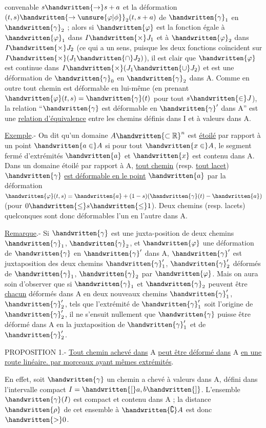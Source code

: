 
convenable $s\handwritten{\to}s+a$ et la déformation $(t,s)\handwritten{\to\unsure{\varphi|\phi}}_2(t,s+a)$ de $\handwritten{\gamma}_1$ en $\handwritten{\gamma}_2$ ; alors si $\handwritten{\varphi}$ est la fonction égale à $\handwritten{\varphi}_1$ dans \handwritten{\unsure{\textasciigrave|\textbackslash}}$I\handwritten{\times}J_1$ et à $\handwritten{\varphi}_2$ dans $I\handwritten{\times}J_2$ (ce qui a un sens, puisque les deux fonctions coïncident sur $I\handwritten{\times}(J_1\handwritten{\cap}J_2)$), il est clair que $\handwritten{\varphi}$ est continue dans $I\handwritten{\times}(J_1\handwritten{\cup}J_2)$ et est une déformation de $\handwritten{\gamma}_0$ en $\handwritten{\gamma}_2$ dans A. Comme en outre tout chemin est déformable en lui-même (en prenant $\handwritten{\varphi}(t,s)=\handwritten{\gamma}(t)$ pour tout $s\handwritten{\in}J$), la relation ``$\handwritten{\gamma}$ est déformable en $\handwritten{\gamma}'$ dans A'' est une \uline{relation d'équivalence} entre les chemins définis dans I et à valeurs dans A.

\uline{Exemple}.- On dit qu'un domaine $A\handwritten{\subset\mathbb{R}}^n$ est \uline{étoilé} par rapport à un point $\handwritten{a\in}A$ si pour tout $\handwritten{x\in}A$, le segment fermé d'extrémités $\handwritten{a}$ et $\handwritten{x}$ est contenu dans A. Dans un domaine étoilé par rapport à A, \uline{tout chemin} (resp. \uline{tout lacet}) $\handwritten{\gamma}$ \uline{est déformable en le point} $\handwritten{a}$ par la déformation $\handwritten{\varphi}(t,s)=\handwritten{a}+(1-s)(\handwritten{\gamma}(t)-\handwritten{a})$ (pour $0\handwritten{\leq}s\handwritten{\leq}1$). Deux chemins (resp. lacets) quelconques sont donc déformables l'un en l'autre dans A.

\uline{Remarque}.- Si $\handwritten{\gamma}$ est une juxta-position de deux chemins $\handwritten{\gamma}_1$, $\handwritten{\gamma}_2$, et $\handwritten{\varphi}$ une déformation de $\handwritten{\gamma}$ en $\handwritten{\gamma}'$ dans A, $\handwritten{\gamma}'$ est juxtaposition des deux chemins $\handwritten{\gamma}'_1$, $\handwritten{\gamma}'_2$ déformés de $\handwritten{\gamma}_1$, $\handwritten{\gamma}_2$ par $\handwritten{\varphi}$. Mais on aura soin d'observer que si $\handwritten{\gamma}_1$ et $\handwritten{\gamma}_2$ peuvent être \uline{chacun} déformés dans A en deux nouveaux chemins $\handwritten{\gamma}'_1$, $\handwritten{\gamma}'_2$, tels que l'extrémité de $\handwritten{\gamma}'_1$ soit l'origine de $\handwritten{\gamma}'_2$, il ne s'ensuit nullement que $\handwritten{\gamma}$ puisse être déformé dans A en la juxtaposition de $\handwritten{\gamma}'_1$ et de $\handwritten{\gamma}'_2$.

PROPOSITION 1.- \uline{Tout chemin achevé dans} A \uline{peut être déformé dans} A \uline{en une route linéaire. par morceaux ayant mêmes extrémités}.

En effet, soit $\handwritten{\gamma}$ un chemin a chevé à valeurs dans A, défini dans l'intervalle compact $I=\handwritten{[}a,b\handwritten{]}$. L'ensemble $\handwritten{\gamma}(I)$ est compact et contenu dans A ; la distance $\handwritten{\rho}$ de cet ensemble à $\handwritten{\complement}A$ est donc $\handwritten{>}0$.
